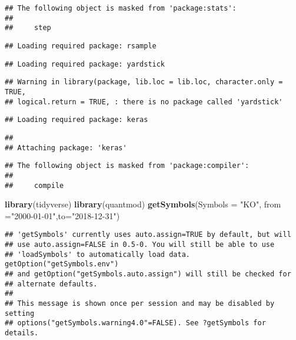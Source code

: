 \documentclass[]{article}
\newenvironment{Shaded}{\begin{snugshade}}{\end{snugshade}}
\newcommand{\DataTypeTok}[1]{\textcolor[rgb]{0.13,0.29,0.53}{#1}}
\newcommand{\KeywordTok}[1]{\textcolor[rgb]{0.13,0.29,0.53}{\textbf{#1}}}
\newcommand{\NormalTok}[1]{#1}
\newcommand{\StringTok}[1]{\textcolor[rgb]{0.31,0.60,0.02}{#1}}
\begin{document}
\begin{verbatim}
## The following object is masked from 'package:stats':
## 
##     step
\end{verbatim}

\begin{verbatim}
## Loading required package: rsample
\end{verbatim}

\begin{verbatim}
## Loading required package: yardstick
\end{verbatim}

\begin{verbatim}
## Warning in library(package, lib.loc = lib.loc, character.only = TRUE,
## logical.return = TRUE, : there is no package called 'yardstick'
\end{verbatim}

\begin{verbatim}
## Loading required package: keras
\end{verbatim}

\begin{verbatim}
## 
## Attaching package: 'keras'
\end{verbatim}

\begin{verbatim}
## The following object is masked from 'package:compiler':
## 
##     compile
\end{verbatim}

\begin{Shaded}
\begin{Highlighting}[]
\KeywordTok{library}\NormalTok{(tidyverse)}
\KeywordTok{library}\NormalTok{(quantmod)}
\KeywordTok{getSymbols}\NormalTok{(}\DataTypeTok{Symbols =} \StringTok{"KO"}\NormalTok{, }\DataTypeTok{from =}\StringTok{"2000-01-01"}\NormalTok{,}\DataTypeTok{to=}\StringTok{"2018-12-31"}\NormalTok{)}
\end{Highlighting}
\end{Shaded}

\begin{verbatim}
## 'getSymbols' currently uses auto.assign=TRUE by default, but will
## use auto.assign=FALSE in 0.5-0. You will still be able to use
## 'loadSymbols' to automatically load data. getOption("getSymbols.env")
## and getOption("getSymbols.auto.assign") will still be checked for
## alternate defaults.
## 
## This message is shown once per session and may be disabled by setting 
## options("getSymbols.warning4.0"=FALSE). See ?getSymbols for details.
\end{verbatim}
\end{document}
